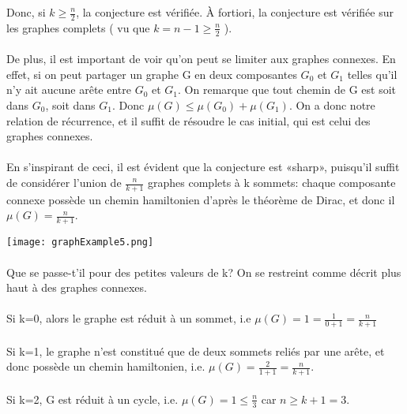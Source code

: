 \documentclass[a4paper]{article}
\theoremstyle{definition}
\theoremstyle{remark}
\begin{document}
Donc, si $k \geq \frac{n}{2}$, la conjecture est vérifiée. À fortiori, la
conjecture est vérifiée sur les graphes complets ( vu que $k = n-1 \geq \frac{n}{2}$ ).


\paragraph{}
De plus, il est important de voir qu'on peut se limiter aux graphes connexes. En effet, si on peut partager un graphe G en deux composantes
$G_{0}$ et $G_{1}$ telles qu'il n'y ait aucune arête entre $G_{0}$ et $G_{1}$. On remarque que tout chemin de G est soit dans $G_{0}$, soit dans $G_{1}$.
Donc $\mu(G) \leq \mu(G_{0}) + \mu(G_{1})$. On a donc notre relation de
récurrence, et il suffit de résoudre le cas initial, qui est celui des graphes connexes.


\paragraph{}
En s'inspirant de ceci, il est évident que la conjecture est «sharp», puisqu'il suffit de considérer l'union de $\frac{n}{k+1}$ graphes complets à k sommets: chaque composante connexe possède un chemin 
hamiltonien d'après le théorème de Dirac, et donc il $\mu(G)=\frac{n}{k+1}$.


\texttt{[image: graphExample5.png]}


\paragraph{}
Que se passe-t'il pour des petites valeurs de k? On se restreint comme décrit plus haut à des graphes connexes.


\paragraph{}
Si k=0, alors le graphe est réduit à un sommet, i.e $\mu(G)=1=\frac{1}{0+1}=\frac{n}{k+1}$


\paragraph{}
Si k=1, le graphe n'est constitué que de deux sommets reliés par une arête, et donc possède un chemin hamiltonien, i.e. $\mu(G)=\frac{2}{1+1}=\frac{n}{k+1}$.


\paragraph{}
Si k=2, G est réduit à un cycle, i.e. $\mu(G)=1 \leq \frac{n}{3}$ car $n \geq k+1 = 3$.
\end{document}
